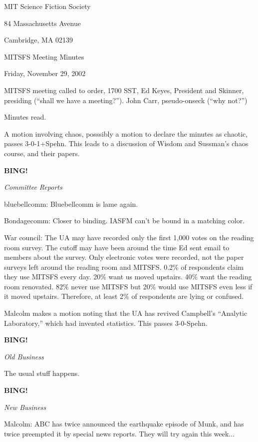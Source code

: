 \documentclass[12pt]{article}
\newcommand{\bing}{{\bf BING!} }
\newcommand{\goto}[1]{\bing \vskip 12pt \centerline{{\em{#1}}}}
\begin{document}
\begin{center}

MIT Science Fiction Society 

84 Massachusetts Avenue

Cambridge, MA 02139

\vspace{12pt}

MITSFS Meeting Minutes 

Friday, November 29, 2002

\end{center}
 
\vspace{18pt}

\setlength{\parskip}{6pt}

\noindent
MITSFS meeting called to order, 1700 SST, Ed Keyes, President and
Skinner, presiding (``shall we have a meeting?'').
John Carr, pseudo-onseck (``why not?'')

Minutes read.

A motion involving chaos, posssibly a motion to declare the minutes
as chaotic, passes \hbox{3-0-1+Spehn}.  This leads to a discussion of
Wisdom and Sussman's chaos course, and their papers.

\goto{Committee Reports}

bluebellcomm: Bluebellcomm is lame again.

Bondagecomm: Closer to binding.  IASFM can't be bound in a matching color.

War council: The UA may have recorded only the first 1,000 votes on the
reading room survey.  The cutoff may have been around the time Ed sent
email to members about the survey.  Only electronic votes were recorded,
not the paper surveys left around the reading room and MITSFS.  0.2\% of
respondents claim they use MITSFS every day.  20\% want us moved upstairs.
40\% want the reading room renovated.  82\% never use MITSFS but 20\% would
use MITSFS even less if it moved upstairs.  Therefore, at least 2\% of
respondents are lying or confused.

Malcolm makes a motion noting that the UA has revived Campbell's ``Analytic
Laboratory,'' which had invented statistics.  This passes \hbox{3-0-Spehn}.

\goto{Old Business}

The usual stuff happens.

\goto{New Business}

Malcolm: ABC has twice announced the earthquake episode of Munk, and
has twice preempted it by special news reports.  They will try again
this week...
\end{document}
